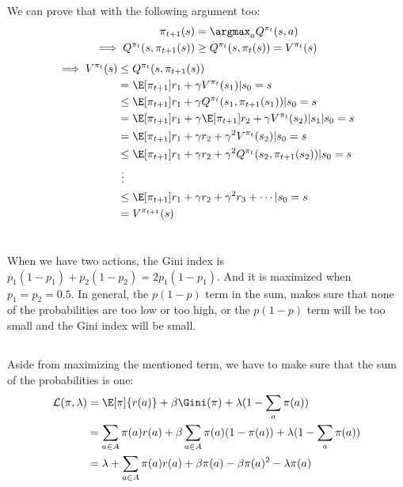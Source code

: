 \documentclass{article}
\begin{document}
We can prove that with the following argument too:
\begin{align*}
\pi_{t+1}(s) &= \argmax_a Q^{\pi_{t}}(s,a)\\
\implies Q^{\pi_{t}}(s, \pi_{t+1}(s)) &\ge Q^{\pi_{t}}(s, \pi_{t}(s)) = V^{\pi_{t}}(s)    
\end{align*}
\begin{align*}
\implies V^{\pi_{t}}(s) &\le Q^{\pi_{t}}(s, \pi_{t+1}(s))\\
&= \E[\pi_{t+1}]{r_{1} + \gamma V^{\pi_{t}}(s_{1})|s_{0}=s}\\
&\le \E[\pi_{t+1}]{r_{1} + \gamma Q^{\pi_{t}}(s_{1}, \pi_{t+1}(s_{1}))|s_{0}=s}\\
&= \E[\pi_{t+1}]{r_{1} + \gamma \E[\pi_{t+1}]{r_{2} + \gamma V^{\pi_{t}}(s_{2})|s_{1}}|s_{0}=s}\\
&= \E[\pi_{t+1}]{r_{1} + \gamma r_{2} + \gamma^2 V^{\pi_{t}}(s_{2})|s_{0}=s}\\
&\le \E[\pi_{t+1}]{r_{1} + \gamma r_{2} + \gamma^2 Q^{\pi_{t}}(s_{2}, \pi_{t+1}(s_{2}))|s_{0}=s}\\
& \ \vdots\\ 
&\le \E[\pi_{t+1}]{r_{1} + \gamma r_{2} + \gamma^2 r_{3} + \cdots|s_{0}=s}\\
&= V^{\pi_{t+1}}(s)
\end{align*}

\section{}
\subsection{}
When we have two actions, the Gini index is \(p_1(1-p_1) + p_2(1-p_2) = 2p_1(1-p_1)\).
And it is maximized when \(p_1 = p_2 = 0.5\).
In general, the \(p(1-p)\) term in the sum, makes sure that none of the probabilities are too low or too high, or the \(p(1-p)\) term will be too small and the Gini index will be small.

\subsection{}
Aside from maximizing the mentioned term, we have to make sure that the sum of the probabilities is one:
\begin{align*}
\mathcal{L}(\pi, \lambda) &= \E[\pi]{r(a)} + \beta \Gini (\pi) + \lambda (1 - \sum_{a} \pi(a))\\
&= \sum_{a \in A} \pi(a) r(a) + \beta \sum_{a \in A} \pi(a) (1 - \pi(a)) + \lambda (1 - \sum_{a} \pi(a))\\
&= \lambda + \sum_{a \in A} \pi(a) r(a) + \beta \pi(a) - \beta \pi(a)^2 - \lambda \pi(a)
\end{align*}
\end{document}
